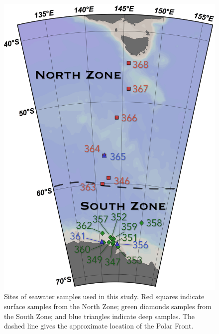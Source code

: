 \begin{figure}
  \centering
  \includegraphics[width=\textwidth]{../polarfront/samplemap.png}
  \caption[Map showing sites of seawater samples used in the Polar Front study]{Sites of seawater samples used in this study. Red squares indicate surface samples from the North Zone; green diamonds samples from the South Zone; and blue triangles indicate deep samples. The dashed line gives the approximate location of the Polar Front.}
  \label{fig:samplemap}
\end{figure}
